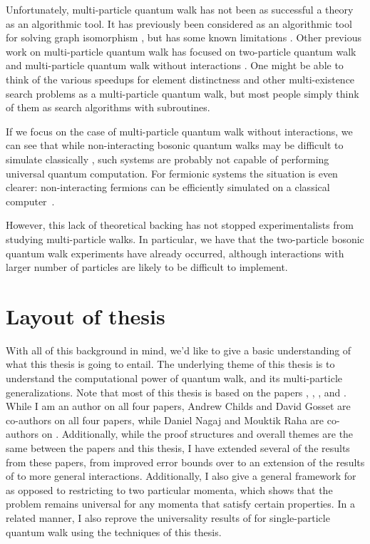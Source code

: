 \documentclass[../thesis-main/thesis-main]{subfiles}
\begin{document}
Unfortunately, multi-particle quantum walk has not been as successful a theory as an algorithmic tool.   It has previously been considered as an algorithmic tool for solving graph isomorphism \cite{gamble2010}, but has some known limitations \cite{Smi11}. Other previous work on multi-particle quantum walk has focused on two-particle quantum walk \cite{sheridan2006,PA07,BLMS09,PLM10,OBB11,lahini2012,SSVMCRO12} and multi-particle quantum walk without interactions \cite{sheridan2006,PA07,BLMS09,PLM10,OBB11,Rohde11}.  One might be able to think of the various speedups for element distinctness and other multi-existence search problems as a multi-particle quantum walk, but most people simply think of them as search algorithms with subroutines.

If we focus on the case of multi-particle quantum walk without interactions, we can see that while non-interacting bosonic quantum walks may be difficult to simulate classically \cite{AA11}, such systems are probably not capable of performing universal quantum computation.  For fermionic systems the situation is even clearer: non-interacting fermions can be efficiently simulated on a classical computer~\cite{TD02}.

However, this lack of theoretical backing has not stopped experimentalists from studying multi-particle walks.  In particular, we have that the two-particle bosonic quantum walk experiments \cite{BLMS09,PLM10,OBB11,SSVMCRO12} have already occurred, although interactions with larger number of particles are likely to be difficult to implement.



\section{Layout of thesis}

With all of this background in mind, we'd like to give a basic understanding of what this thesis is going to entail.  The underlying theme of this thesis is to understand the computational power of quantum walk, and its multi-particle generalizations.  Note that most of this thesis is based on the papers \cite{MPQW}, \cite{MomSwitches}, \cite{BHQMA}, and \cite{XYQMA}.  While I am an author on all four papers, Andrew Childs and David Gosset are co-authors on all four papers, while Daniel Nagaj and Mouktik Raha are co-authors on \cite{MomSwitches}.  Additionally, while the proof structures and overall themes are the same between the papers and this thesis, I have extended several of the results from these papers, from improved error bounds over \cite{MPQW} to an extension of the results of \cite{BHQMA} to more general interactions.  Additionally, I also give a general framework for \cite{MPQW} as opposed to restricting to two particular momenta, which shows that the problem remains universal for any momenta that satisfy certain properties.  In a related manner, I also reprove the universality results of \cite{Chi09} for single-particle quantum walk using the techniques of this thesis.
\end{document}
